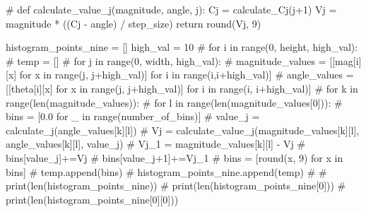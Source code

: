 \documentclass[
  letterpaper,
  DIV=11,
  numbers=noendperiod]{scrreprt}
\newenvironment{Shaded}{\begin{snugshade}}{\end{snugshade}}
\newcommand{\BuiltInTok}[1]{\textcolor[rgb]{0.00,0.23,0.31}{#1}}
\newcommand{\CommentTok}[1]{\textcolor[rgb]{0.37,0.37,0.37}{#1}}
\newcommand{\ControlFlowTok}[1]{\textcolor[rgb]{0.00,0.23,0.31}{#1}}
\newcommand{\DecValTok}[1]{\textcolor[rgb]{0.68,0.00,0.00}{#1}}
\newcommand{\KeywordTok}[1]{\textcolor[rgb]{0.00,0.23,0.31}{#1}}
\newcommand{\NormalTok}[1]{\textcolor[rgb]{0.00,0.23,0.31}{#1}}
\newcommand{\OperatorTok}[1]{\textcolor[rgb]{0.37,0.37,0.37}{#1}}
\begin{document}
\begin{Shaded}
\begin{Highlighting}[]
\CommentTok{\# }
\KeywordTok{def}\NormalTok{ calculate\_value\_j(magnitude, angle, j):}
\NormalTok{  Cj }\OperatorTok{=}\NormalTok{ calculate\_Cj(j}\OperatorTok{+}\DecValTok{1}\NormalTok{)}
\NormalTok{  Vj }\OperatorTok{=}\NormalTok{ magnitude }\OperatorTok{*}\NormalTok{ ((Cj }\OperatorTok{{-}}\NormalTok{ angle) }\OperatorTok{/}\NormalTok{ step\_size)}
  \ControlFlowTok{return} \BuiltInTok{round}\NormalTok{(Vj, }\DecValTok{9}\NormalTok{)}
\end{Highlighting}
\end{Shaded}

\begin{Shaded}
\begin{Highlighting}[]
\NormalTok{histogram\_points\_nine }\OperatorTok{=}\NormalTok{ []}
\NormalTok{high\_val }\OperatorTok{=} \DecValTok{10}
\CommentTok{\# for i in range(0, height, high\_val):}
\CommentTok{\#   temp = []}
\CommentTok{\#   for j in range(0, width, high\_val):}
\CommentTok{\#     magnitude\_values = [[mag[i][x] for x in range(j, j+high\_val)] for i in range(i,i+high\_val)]}
\CommentTok{\#     angle\_values = [[theta[i][x] for x in range(j, j+high\_val)] for i in range(i, i+high\_val)]}
\CommentTok{\#     for k in range(len(magnitude\_values)):}
\CommentTok{\#       for l in range(len(magnitude\_values[0])):}
\CommentTok{\#         bins = [0.0 for \_ in range(number\_of\_bins)]}
\CommentTok{\#         value\_j = calculate\_j(angle\_values[k][l])}
\CommentTok{\#         Vj = calculate\_value\_j(magnitude\_values[k][l], angle\_values[k][l], value\_j)}
\CommentTok{\#         Vj\_1 = magnitude\_values[k][l] {-} Vj}
\CommentTok{\#         bins[value\_j]+=Vj}
\CommentTok{\#         bins[value\_j+1]+=Vj\_1}
\CommentTok{\#         bins = [round(x, 9) for x in bins]}
\CommentTok{\#     temp.append(bins)}
\CommentTok{\#   histogram\_points\_nine.append(temp)}
\CommentTok{\# }
\CommentTok{\# print(len(histogram\_points\_nine))}
\CommentTok{\# print(len(histogram\_points\_nine[0]))}
\CommentTok{\# print(len(histogram\_points\_nine[0][0]))}
\end{Highlighting}
\end{Shaded}
\end{document}
